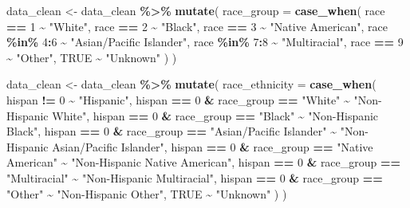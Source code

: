 \documentclass[
]{article}
\newenvironment{Shaded}{\begin{snugshade}}{\end{snugshade}}
\newcommand{\AttributeTok}[1]{\textcolor[rgb]{0.13,0.29,0.53}{#1}}
\newcommand{\ConstantTok}[1]{\textcolor[rgb]{0.56,0.35,0.01}{#1}}
\newcommand{\DecValTok}[1]{\textcolor[rgb]{0.00,0.00,0.81}{#1}}
\newcommand{\FunctionTok}[1]{\textcolor[rgb]{0.13,0.29,0.53}{\textbf{#1}}}
\newcommand{\NormalTok}[1]{#1}
\newcommand{\OtherTok}[1]{\textcolor[rgb]{0.56,0.35,0.01}{#1}}
\newcommand{\SpecialCharTok}[1]{\textcolor[rgb]{0.81,0.36,0.00}{\textbf{#1}}}
\newcommand{\StringTok}[1]{\textcolor[rgb]{0.31,0.60,0.02}{#1}}
\begin{document}
\begin{Shaded}
\begin{Highlighting}[]
\NormalTok{data\_clean }\OtherTok{\textless{}{-}}\NormalTok{ data\_clean }\SpecialCharTok{\%\textgreater{}\%}
  \FunctionTok{mutate}\NormalTok{(}
    \AttributeTok{race\_group =} \FunctionTok{case\_when}\NormalTok{(}
\NormalTok{      race }\SpecialCharTok{==} \DecValTok{1} \SpecialCharTok{\textasciitilde{}} \StringTok{"White"}\NormalTok{,}
\NormalTok{      race }\SpecialCharTok{==} \DecValTok{2} \SpecialCharTok{\textasciitilde{}} \StringTok{"Black"}\NormalTok{,}
\NormalTok{      race }\SpecialCharTok{==} \DecValTok{3} \SpecialCharTok{\textasciitilde{}} \StringTok{"Native American"}\NormalTok{,}
\NormalTok{      race }\SpecialCharTok{\%in\%} \DecValTok{4}\SpecialCharTok{:}\DecValTok{6} \SpecialCharTok{\textasciitilde{}} \StringTok{"Asian/Pacific Islander"}\NormalTok{,}
\NormalTok{      race }\SpecialCharTok{\%in\%} \DecValTok{7}\SpecialCharTok{:}\DecValTok{8} \SpecialCharTok{\textasciitilde{}} \StringTok{"Multiracial"}\NormalTok{,}
\NormalTok{      race }\SpecialCharTok{==} \DecValTok{9} \SpecialCharTok{\textasciitilde{}} \StringTok{"Other"}\NormalTok{,}
      \ConstantTok{TRUE} \SpecialCharTok{\textasciitilde{}} \StringTok{"Unknown"}
\NormalTok{    )}
\NormalTok{  )}


\NormalTok{data\_clean }\OtherTok{\textless{}{-}}\NormalTok{ data\_clean }\SpecialCharTok{\%\textgreater{}\%}
  \FunctionTok{mutate}\NormalTok{(}
    \AttributeTok{race\_ethnicity =} \FunctionTok{case\_when}\NormalTok{(}
\NormalTok{      hispan }\SpecialCharTok{!=} \DecValTok{0} \SpecialCharTok{\textasciitilde{}} \StringTok{"Hispanic"}\NormalTok{,}
\NormalTok{      hispan }\SpecialCharTok{==} \DecValTok{0} \SpecialCharTok{\&}\NormalTok{ race\_group }\SpecialCharTok{==} \StringTok{"White"} \SpecialCharTok{\textasciitilde{}} \StringTok{"Non{-}Hispanic White"}\NormalTok{,}
\NormalTok{      hispan }\SpecialCharTok{==} \DecValTok{0} \SpecialCharTok{\&}\NormalTok{ race\_group }\SpecialCharTok{==} \StringTok{"Black"} \SpecialCharTok{\textasciitilde{}} \StringTok{"Non{-}Hispanic Black"}\NormalTok{,}
\NormalTok{      hispan }\SpecialCharTok{==} \DecValTok{0} \SpecialCharTok{\&}\NormalTok{ race\_group }\SpecialCharTok{==} \StringTok{"Asian/Pacific Islander"} \SpecialCharTok{\textasciitilde{}} \StringTok{"Non{-}Hispanic Asian/Pacific Islander"}\NormalTok{,}
\NormalTok{      hispan }\SpecialCharTok{==} \DecValTok{0} \SpecialCharTok{\&}\NormalTok{ race\_group }\SpecialCharTok{==} \StringTok{"Native American"} \SpecialCharTok{\textasciitilde{}} \StringTok{"Non{-}Hispanic Native American"}\NormalTok{,}
\NormalTok{      hispan }\SpecialCharTok{==} \DecValTok{0} \SpecialCharTok{\&}\NormalTok{ race\_group }\SpecialCharTok{==} \StringTok{"Multiracial"} \SpecialCharTok{\textasciitilde{}} \StringTok{"Non{-}Hispanic Multiracial"}\NormalTok{,}
\NormalTok{      hispan }\SpecialCharTok{==} \DecValTok{0} \SpecialCharTok{\&}\NormalTok{ race\_group }\SpecialCharTok{==} \StringTok{"Other"} \SpecialCharTok{\textasciitilde{}} \StringTok{"Non{-}Hispanic Other"}\NormalTok{,}
      \ConstantTok{TRUE} \SpecialCharTok{\textasciitilde{}} \StringTok{"Unknown"}
\NormalTok{    )}
\NormalTok{  )}
\end{Highlighting}
\end{Shaded}
\end{document}
